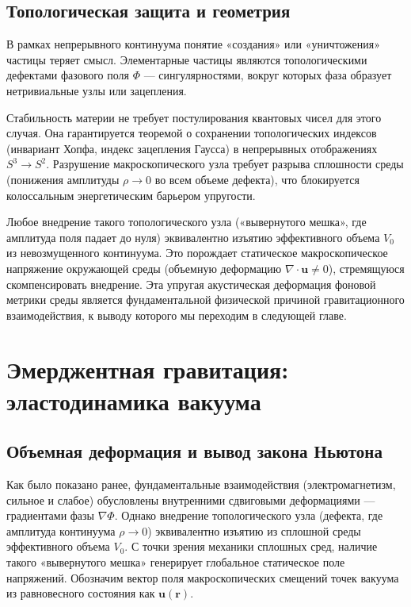 \documentclass[12pt,a4paper]{article}
\begin{document}
	\subsection{Топологическая защита и геометрия}
В рамках непрерывного континуума понятие «создания» или «уничтожения» частицы теряет смысл. Элементарные частицы являются топологическими дефектами фазового поля $\Phi$ — сингулярностями, вокруг которых фаза образует нетривиальные узлы или зацепления.

Стабильность материи не требует постулирования квантовых чисел для этого случая. Она гарантируется теоремой о сохранении топологических индексов (инвариант Хопфа, индекс зацепления Гаусса) в непрерывных отображениях $S^3 \to S^2$. Разрушение макроскопического узла требует разрыва сплошности среды (понижения амплитуды $\rho \to 0$ во всем объеме дефекта), что блокируется колоссальным энергетическим барьером упругости.

Любое внедрение такого топологического узла («вывернутого мешка», где амплитуда поля падает до нуля) эквивалентно изъятию эффективного объема $V_0$ из невозмущенного континуума. Это порождает статическое макроскопическое напряжение окружающей среды (объемную деформацию $\nabla \cdot \mathbf{u} \neq 0$), стремящуюся скомпенсировать внедрение. Эта упругая акустическая деформация фоновой метрики среды является фундаментальной физической причиной гравитационного взаимодействия, к выводу которого мы переходим в следующей главе.

\section{Эмерджентная гравитация: эластодинамика вакуума}

\subsection{Объемная деформация и вывод закона Ньютона}
Как было показано ранее, фундаментальные взаимодействия (электромагнетизм, сильное и слабое) обусловлены внутренними сдвиговыми деформациями — градиентами фазы $\nabla \Phi$. Однако внедрение топологического узла (дефекта, где амплитуда континуума $\rho \to 0$) эквивалентно изъятию из сплошной среды эффективного объема $V_0$. 
С точки зрения механики сплошных сред, наличие такого «вывернутого мешка» генерирует глобальное статическое поле напряжений. Обозначим вектор поля макроскопических смещений точек вакуума из равновесного состояния как $\mathbf{u}(\mathbf{r})$.
\end{document}
